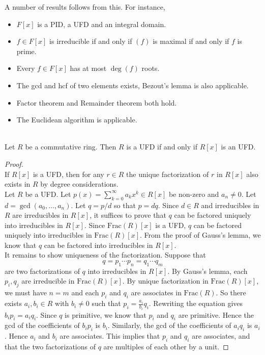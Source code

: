 \documentclass[a4paper]{article}
\begin{document}
A number of results follows from this. For instance, 
\begin{itemize}
\item $F[x]$ is a PID, a UFD and an integral domain. 
\item $f\in F[x]$ is irreducible if and only if $(f)$ is maximal if and only if $f$ is prime. 
\item Every $f\in F[x]$ has at most $\deg(f)$ roots. 
\item The gcd and hcf of two elements exists, Bezout's lemma is also applicable. 
\item Factor theorem and Remainder theorem both hold. 
\item The Euclidean algorithm is applicable. 
\end{itemize}

\begin{prp}{}{}\\
Let $R$ be a commutative ring. Then $R$ is a UFD if and only if $R[x]$ is an UFD. 
\begin{proof}\\
If $R[x]$ is a UFD, then for any $r\in R$ the unique factorization of $r$ in $R[x]$ also exists in $R$ by degree considerations. \\

Let $R$ be a UFD. Let $p(x)=\sum_{k=0}^\infty a_kx^k\in R[x]$ be non-zero and $a_n\neq 0$. Let $d=\gcd(a_0,\dots,a_n)$. Let $q=p/d$ so that $p=dq$. Since $d\in R$ and irreducibles in $R$ are irreducibles in $R[x]$, it suffices to prove that $q$ can be factored uniquely into irreducibles in $R[x]$. Since $\text{Frac}(R)[x]$ is a UFD, $q$ can be factored uniquely into irreducibles in $\text{Frac}(R)[x]$. From the proof of Gauss's lemma, we know that $q$ can be factored into irreducibles in $R[x]$. \\

It remains to show uniqueness of the factorization. Suppose that $$q=p_1\cdots p_n=q_1\cdots q_m$$ are two factorizations of $q$ into irreducibles in $R[x]$. By Gauss's lemma, each $p_i,q_j$ are irreducible in $\text{Frac}(R)[x]$. By unique factorization in $\text{Frac}(R)[x]$, we must have $n=m$ and each $p_i$ and $q_i$ are associates in $\text{Frac}(R)$. So there exists $a_i,b_i\in R$ with $b_i\neq 0$ such that $p_i=\frac{a_i}{b_i}q_i$. Rewriting the equation gives $b_ip_i=a_iq_i$. Since $q$ is primitive, we know that $p_i$ and $q_i$ are primitive. Hence the gcd of the coefficients of $b_ip_i$ is $b_i$. Similarly, the gcd of the coefficients of $a_iq_i$ is $a_i$. Hence $a_i$ and $b_i$ are associates. This implies that $p_i$ and $q_i$ are associates, and that the two factorizations of $q$ are multiples of each other by a unit. 
\end{proof}
\end{prp}
\end{document}
